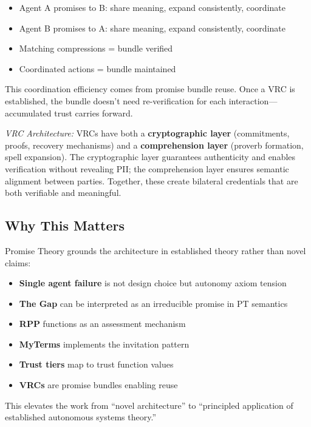 \documentclass[
  11pt,
]{article}
\providecommand{\tightlist}{%
  \setlength{\itemsep}{0pt}\setlength{\parskip}{0pt}}
\begin{document}
\begin{itemize}
\tightlist
\item
  Agent A promises to B: share meaning, expand consistently, coordinate
\item
  Agent B promises to A: share meaning, expand consistently, coordinate
\item
  Matching compressions = bundle verified
\item
  Coordinated actions = bundle maintained
\end{itemize}

This coordination efficiency comes from promise bundle reuse. Once a VRC
is established, the bundle doesn't need re-verification for each
interaction---accumulated trust carries forward.

\emph{VRC Architecture:} VRCs have both a \textbf{cryptographic layer}
(commitments, proofs, recovery mechanisms) and a \textbf{comprehension
layer} (proverb formation, spell expansion). The cryptographic layer
guarantees authenticity and enables verification without revealing PII;
the comprehension layer ensures semantic alignment between parties.
Together, these create bilateral credentials that are both verifiable
and meaningful.

\subsection{Why This Matters}\label{why-this-matters}

Promise Theory grounds the architecture in established theory rather
than novel claims:

\begin{itemize}
\tightlist
\item
  \textbf{Single agent failure} is not design choice but autonomy axiom
  tension
\item
  \textbf{The Gap} can be interpreted as an irreducible promise in PT
  semantics
\item
  \textbf{RPP} functions as an assessment mechanism
\item
  \textbf{MyTerms} implements the invitation pattern
\item
  \textbf{Trust tiers} map to trust function values
\item
  \textbf{VRCs} are promise bundles enabling reuse
\end{itemize}

This elevates the work from ``novel architecture'' to ``principled
application of established autonomous systems theory.''
\end{document}
